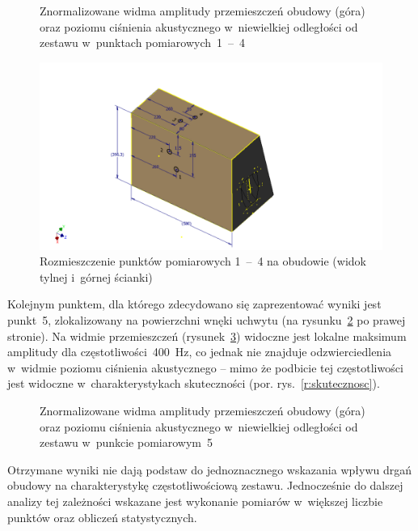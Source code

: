 \documentclass[12pt]{oska}
\newcommand{\range}[2]{\num{#1}~--~\num{#2}}
\begin{document}
		\begin{figure}[!ht]
			\centering
			\caption{Znormalizowane widma amplitudy przemieszczeń obudowy (góra) oraz poziomu ciśnienia akustycznego w~niewielkiej odległości od zestawu w~punktach pomiarowych~\range{1}{4}}
			\label{r:wibrometr_1-4}
		\end{figure}
		
		\begin{figure}[!ht]
			\centering
			\includegraphics[width=.8\textwidth,trim={5cm .3cm 5cm 2.7cm},clip]{wibrometr.pdf}
			\caption{Rozmieszczenie punktów pomiarowych \range{1}{4} na obudowie (widok tylnej i~górnej ścianki)}
			\label{r:wibro_pkt}
		\end{figure}
		
		Kolejnym punktem, dla którego zdecydowano się zaprezentować wyniki jest punkt~\num{5}, zlokalizowany na powierzchni wnęki uchwytu (na rysunku~\ref{r:wibro_pkt} po prawej stronie). Na widmie przemieszczeń (rysunek~\ref{r:wibrometr_5}) widoczne jest lokalne maksimum amplitudy dla częstotliwości~\SI{400}{\hertz}, co jednak nie znajduje odzwierciedlenia w~widmie poziomu ciśnienia akustycznego -- mimo że podbicie tej częstotliwości jest widoczne w~charakterystykach skuteczności (por. rys.~\ref{r:skutecznosc}).%
		
		\begin{figure}[!ht]
			\centering
			\caption{Znormalizowane widma amplitudy przemieszczeń obudowy (góra) oraz poziomu ciśnienia akustycznego w~niewielkiej odległości od zestawu w~punkcie pomiarowym~\num{5}}
			\label{r:wibrometr_5}
		\end{figure}
		
		Otrzymane wyniki nie dają podstaw do jednoznacznego wskazania wpływu drgań obudowy na charakterystykę częstotliwościową zestawu. Jednocześnie do dalszej analizy tej zależności wskazane jest wykonanie pomiarów w~większej liczbie punktów oraz obliczeń statystycznych.
		
\end{document}
